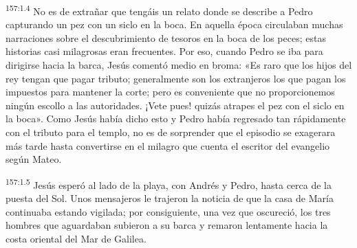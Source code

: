 \par
\textsuperscript{157:1.4} No es de extrañar que tengáis un relato donde se describe a Pedro capturando un pez con un siclo en la boca. En aquella época circulaban muchas narraciones sobre el descubrimiento de tesoros en la boca de los peces; estas historias casi milagrosas eran frecuentes. Por eso, cuando Pedro se iba para dirigirse hacia la barca, Jesús comentó medio en broma: «Es raro que los hijos del rey tengan que pagar tributo; generalmente son los extranjeros los que pagan los impuestos para mantener la corte; pero es conveniente que no proporcionemos ningún escollo a las autoridades. ¡Vete pues! quizás atrapes el pez con el siclo en la boca». Como Jesús había dicho esto y Pedro había regresado tan rápidamente con el tributo para el templo, no es de sorprender que el episodio se exagerara más tarde hasta convertirse en el milagro que cuenta el escritor del evangelio según Mateo.

\par
\textsuperscript{157:1.5} Jesús esperó al lado de la playa, con Andrés y Pedro, hasta cerca de la puesta del Sol. Unos mensajeros le trajeron la noticia de que la casa de María continuaba estando vigilada; por consiguiente, una vez que oscureció, los tres hombres que aguardaban subieron a su barca y remaron lentamente hacia la costa oriental del Mar de Galilea.

